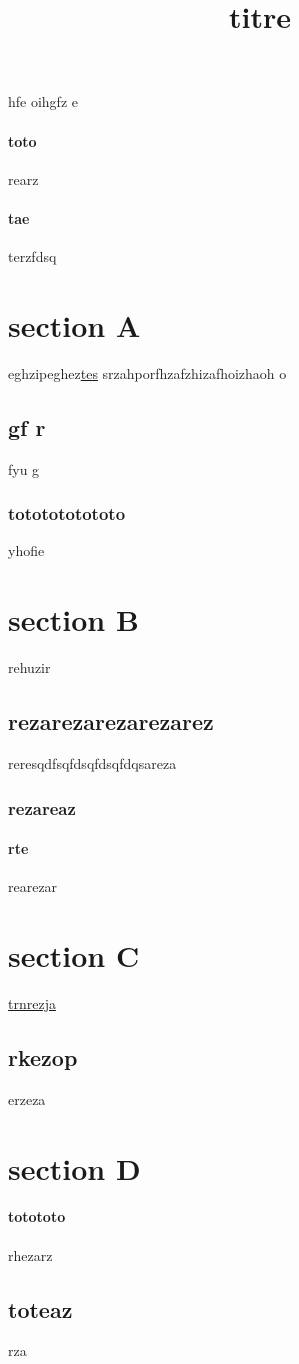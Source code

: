 \documentclass{article}
\title{titre}
\begin{document}
\maketitle
hfe oihgfz e
\paragraph{toto}{rearz}
\paragraph{tae}{terzfdsq}
\section{section A}{eghzipeghez\underline{\color{red}tes}
srzahporfhzafzhizafhoizhaoh o\subsection{gf r}{fyu g\subsubsection{tototototototo}{yhofie}
}}

\section{section B}{rehuzir\subsection{rezarezarezarezarez}{reresqdfsqfds\color{red}qfdsqfdqsareza\subsubsection{rezareaz}{\paragraph{rte}{rearezar}}}}

\section{section C}{\underline{trnrezja}\subsection{rkezop}{erzeza}}
\section{section D}{\paragraph{totototo}{rhezarz}\subsection{toteaz}{rza}}
\begin{itemize}{
	\item toto
	\item tata
\end{itemize}
\end{document}
